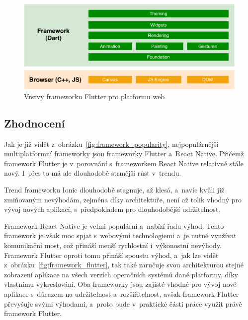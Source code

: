 \begin{figure}
    \centering
    \includegraphics[width=\linewidth]{assets/technology-research/framework/flutter_overview_web.pdf}
    \caption{Vrstvy frameworku Flutter pro platformu web~\cite{flutter_web}}
    \label{fig:flutter_layers_web}
\end{figure}

\pagebreak
\subsection{Zhodnocení}

Jak je již vidět z~obrázku~\ref{fig:framework_popularity},
nejpopulárnější multiplatformní frameworky jsou frameworky Flutter
a~React Native.
Přičemž framework Flutter je v~porovnání s~frameworkem React Native relativně
stále nový.
I~přes to má ale dlouhodobě strmější růst v~trendu.

Trend frameworku Ionic dlouhodobě stagnuje, až klesá,
a~navíc kvůli již zmiňovaným nevýhodám,
zejména díky architektuře,
není až tolik vhodný pro vývoj nových aplikací,
s~předpokladem pro dlouhodobější udržitelnost. 

Framework React Native je velmi populární a~nabízí řadu výhod.
Tento framework je však moc spjat s~webovými technologiemi
a~je nutné využívat komunikační most,
což přináší menší rychlostní i~výkonostní nevýhody.
Framework Flutter oproti tomu přináší spoustu výhod,
a~jak lze vidět z~obrázku~\ref{fig:framework_flutter},
tak také zaručuje svou architekturou stejné zobrazení aplikace na všech
verzích operačních systémů dané platformy,
díky vlastnímu vykreslování.
Oba frameworky jsou zajisté vhodné pro vývoj nové aplikace s~důrazem na
udržitelnost a~rozšiřitelnost,
avšak framework Flutter převyšuje svými výhodami,
a~proto bude v~praktické části práce využit právě framework Flutter.
